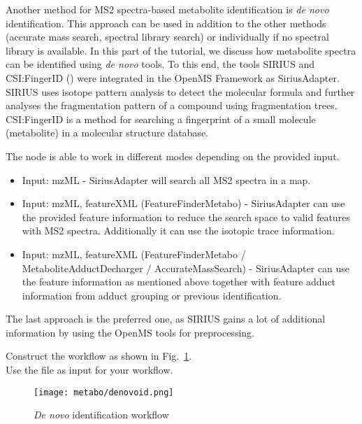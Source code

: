 Another method for MS2 spectra-based metabolite identification is \textit{de novo} identification. 
This approach can be used in addition to the other methods (accurate mass search, spectral library search) or individually if no spectral library is available. In this part of the tutorial, we discuss how metabolite spectra can be identified using \textit{de novo} tools. To this end, the tools SIRIUS and CSI:FingerID (\cite{Bocker2009,Bocker2016,Duhrkop2015}) were integrated in the OpenMS Framework as SiriusAdapter. SIRIUS uses isotope pattern analysis to detect the molecular formula and further analyses the fragmentation pattern of a compound using fragmentation trees. CSI:FingerID  is a method for searching a fingerprint of a small molecule (metabolite) in a molecular structure database.

The node is able to work in different modes depending on the provided input. 
\begin{itemize}
\item Input: mzML - SiriusAdapter will search all MS2 spectra in a map.  
\item Input: mzML, featureXML (FeatureFinderMetabo) - SiriusAdapter can use the provided feature information to reduce the search space to valid features with MS2 spectra. Additionally it can use the isotopic trace information. 
\item Input: mzML, featureXML (FeatureFinderMetabo / MetaboliteAdductDecharger / AccurateMassSearch) - SiriusAdapter can use the feature information as mentioned above together with feature adduct information from adduct grouping or previous identification.
\end{itemize}

The last approach is the preferred one, as SIRIUS gains a lot of additional information by using the OpenMS tools for preprocessing. 

\begin{task}
Construct the workflow as shown in Fig.~\ref{fig:denovoid}. \\
Use the file  as input for your workflow.  
\end{task}

\begin{figure}[htbp]
  \centering
  \texttt{[image: metabo/denovoid.png]}
  \caption{\protect\textit{De novo} identification workflow}
  \label{fig:denovoid}
\end{figure}

